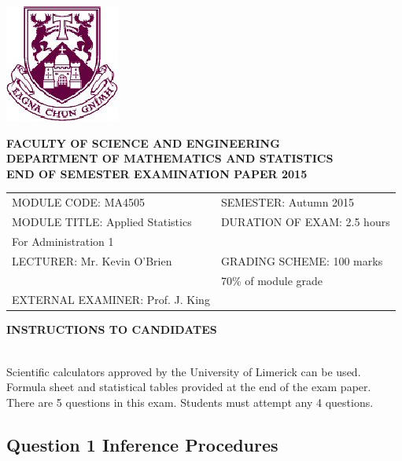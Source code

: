 \documentclass[a4paper,12pt]{article}
\begin{document}
	\begin{center}
		\includegraphics[scale=0.55]{images/shieldtransparent2}
	\end{center}
	
	\begin{center}
		\vspace{1cm}
		\large \bf {FACULTY OF SCIENCE AND ENGINEERING} \\[0.5cm]
		\normalsize DEPARTMENT OF MATHEMATICS AND STATISTICS \\[1.25cm]
		\large \bf {END OF SEMESTER EXAMINATION PAPER 2015} \\[1.5cm]
	\end{center}
	
	\begin{tabular}{ll}
		MODULE CODE: MA4505 & SEMESTER: Autumn 2015 \\[1cm]
		MODULE TITLE: Applied Statistics & DURATION OF EXAM: 2.5 hours  \\
		\phantom{MODULE TITLE:} For Administration 1 & \\ [1cm]
		LECTURER: Mr. Kevin O'Brien & GRADING SCHEME: 100 marks \\
		& \phantom{GRADING SCHEME:} \footnotesize {70\% of module grade} \\[1cm]
EXTERNAL EXAMINER: Prof. J. King & \\
	\end{tabular}
\vspace{0.3cm}
	\begin{center}
		{\bf INSTRUCTIONS TO CANDIDATES}
	\end{center}
	
	{\noindent \\ Scientific calculators approved by the University of Limerick can be used. \\
		Formula sheet and statistical tables provided at the end of the exam paper.\\
		There are 5 questions in this exam. Students must attempt any 4 questions.}
	\newpage
	\subsection*{Question 1 Inference Procedures}
	
\end{document}
